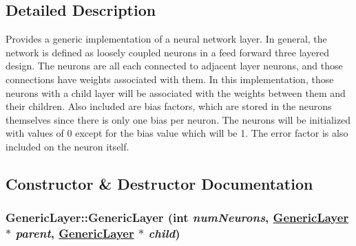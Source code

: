 \subsection{Detailed Description}
Provides a generic implementation of a neural network layer. In general, the network is defined as loosely coupled neurons in a feed forward three layered design. The neurons are all each connected to adjacent layer neurons, and those connections have weights associated with them. In this implementation, those neurons with a child layer will be associated with the weights between them and their children. Also included are bias factors, which are stored in the neurons themselves since there is only one bias per neuron. The neurons will be initialized with values of 0 except for the bias value which will be 1. The error factor is also included on the neuron itself. 



\subsection{Constructor \& Destructor Documentation}
\hypertarget{classGenericLayer_03c284e00a6a3e261665f46dff41a9ea}{
\subsubsection[GenericLayer]{\setlength{\rightskip}{0pt plus 5cm}Generic\-Layer::Generic\-Layer (int {\em num\-Neurons}, \hyperlink{classGenericLayer}{Generic\-Layer} $\ast$ {\em parent}, \hyperlink{classGenericLayer}{Generic\-Layer} $\ast$ {\em child})}}
\label{classGenericLayer_03c284e00a6a3e261665f46dff41a9ea}



